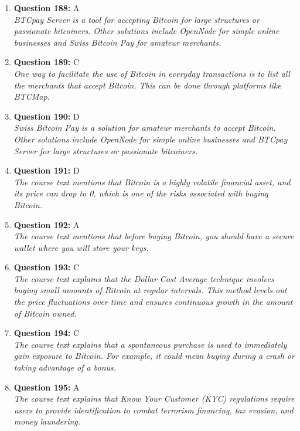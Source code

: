 \documentclass[12pt,a4paper]{article}
\begin{document}
\begin{enumerate}
\item \textbf{Question 188:} A
\\ \textit{BTCpay Server is a tool for accepting Bitcoin for large structures or passionate bitcoiners. Other solutions include OpenNode for simple online businesses and Swiss Bitcoin Pay for amateur merchants.}

\item \textbf{Question 189:} C
\\ \textit{One way to facilitate the use of Bitcoin in everyday transactions is to list all the merchants that accept Bitcoin. This can be done through platforms like BTCMap.}

\item \textbf{Question 190:} D
\\ \textit{Swiss Bitcoin Pay is a solution for amateur merchants to accept Bitcoin. Other solutions include OpenNode for simple online businesses and BTCpay Server for large structures or passionate bitcoiners.}

\item \textbf{Question 191:} D
\\ \textit{The course text mentions that Bitcoin is a highly volatile financial asset, and its price can drop to 0, which is one of the risks associated with buying Bitcoin.}

\item \textbf{Question 192:} A
\\ \textit{The course text mentions that before buying Bitcoin, you should have a secure wallet where you will store your keys.}

\item \textbf{Question 193:} C
\\ \textit{The course text explains that the Dollar Cost Average technique involves buying small amounts of Bitcoin at regular intervals. This method levels out the price fluctuations over time and ensures continuous growth in the amount of Bitcoin owned.}

\item \textbf{Question 194:} C
\\ \textit{The course text explains that a spontaneous purchase is used to immediately gain exposure to Bitcoin. For example, it could mean buying during a crash or taking advantage of a bonus.}

\item \textbf{Question 195:} A
\\ \textit{The course text explains that Know Your Customer (KYC) regulations require users to provide identification to combat terrorism financing, tax evasion, and money laundering.}


\end{enumerate}
\end{document}
